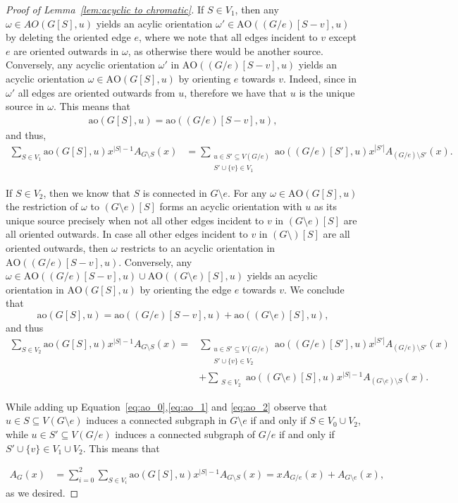 \documentclass[a4paper,11pt,reqno]{amsart}
\numberwithin{equation}{section}
\begin{document}
\begin{proof}[Proof of Lemma~\ref{lem:acyclic to chromatic}]
If $S\in V_1$, then any $\omega\in AO(G[S],u)$ yields an acylic orientation $\omega'\in \text{AO}((G/e)[S-v],u)$ by deleting the oriented edge $e$, where we note that all edges incident to $v$ except $e$ are oriented outwards in $\omega$, as otherwise there would be another source.
Conversely, any acyclic orientation $\omega'$ in $\text{AO}((G/e)[S-v],u)$ yields an acyclic  orientation $\omega\in \text{AO}(G[S],u)$ by orienting $e$ towards $v$. Indeed, since in $\omega'$ all edges are oriented outwards from $u$, therefore  we have that $u$ is the unique source in $\omega$.
This means that
\begin{align*}
    \text{ao}(G[S],u)=\text{ao}((G/e)[S-v],u),
\end{align*}
and thus,
\begin{align}
    \sum_{S\in V_1} \text{ao}(G[S],u) x^{|S|-1} A_{G\setminus S}(x)
    &=\sum_{\substack{u\in S'\subseteq V(G/e) \\ S'\cup\{v\}\in V_1}} \text{ao}((G/e)[S'],u) x^{|S'|} A_{(G/e)\setminus S'}(x).\label{eq:ao_1}
\end{align}


If $S\in V_2$, then we know that $S$ is connected in $G\setminus e$.  
For any $\omega\in \text{AO}(G[S],u)$ the restriction of $\omega$ to $(G\setminus e)[S]$ forms an acyclic orientation with $u$ as its unique source precisely when not all other edges incident to $v$ in $(G\setminus e)[S]$ are all oriented outwards. 
In case all other edges incident to $v$ in $(G\setminus )[S]$ are all oriented outwards, then $\omega$ restricts to an acyclic orientation in $\text{AO}((G/e)[S-v],u)$. 
Conversely, any $\omega\in \text{AO}((G/e)[S-v],u)\cup \text{AO}((G\setminus e)[S],u)$ yields an acyclic orientation in $\text{AO}(G[S],u)$ by orienting the edge $e$ towards $v$.
We conclude that \[\text{ao}(G[S],u)=\text{ao}((G/e)[S-v],u)+\text{ao}((G\setminus e)[S],u),\]
and thus
\begin{align}
    \sum_{S\in V_2} \text{ao}(G[S],u) x^{|S|-1} A_{G\setminus S}(x)=&\sum_{\substack{u\in S'\subseteq V(G/e) \\ S'\cup\{v\}\in V_2}} \text{ao}((G/e)[S'],u) x^{|S'|} A_{(G/e)\setminus S'}(x)\nonumber
    \\
    &+\sum_{\substack{S\in V_2}} \text{ao}((G\setminus e)[S],u) x^{|S|-1} A_{(G\setminus e)\setminus S}(x). \label{eq:ao_2}
\end{align}

While adding up Equation~\eqref{eq:ao_0},\eqref{eq:ao_1} and \eqref{eq:ao_2} observe that $u\in S\subseteq V(G\setminus e)$ induces a connected subgraph in $G\setminus e$ if and only if $S\in V_0\cup V_2$, while $u\in S'\subseteq V(G/e)$ induces a connected subgraph of $G/e$ if and only if $S'\cup\{v\}\in V_1\cup V_2$. This means that

\begin{align*}
A_G(x)&=\sum_{i=0}^2\sum_{S\in V_i} \text{ao}(G[S],u) x^{|S|-1} A_{G\setminus S}(x)=xA_{G/e}(x)+A_{G\setminus e}(x),
\end{align*}
as we desired.
\end{proof}
\end{document}
